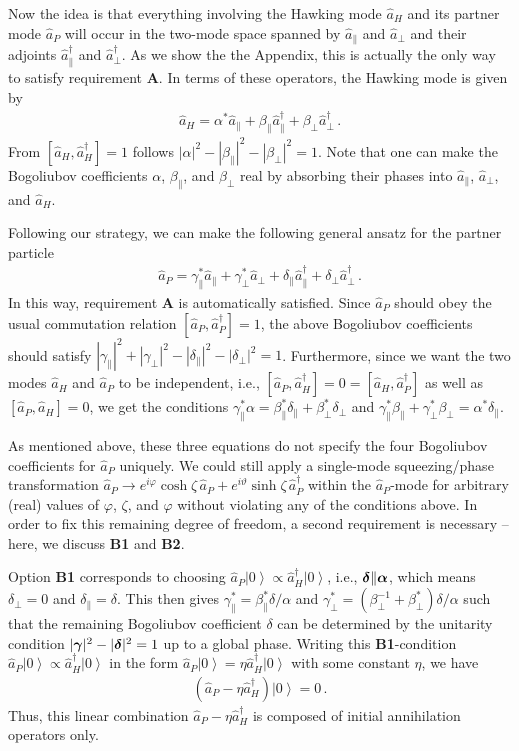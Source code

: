 \documentclass[aps,prd,showpacs,amssymb,nofootinbib,twocolumn]{revtex4}
\newcommand{\ket}[1]{\left|#1\right>}
\newcommand{\f}[1]{\mbox{\boldmath$#1$}}
\newcommand{\bea}{\begin{eqnarray}}
\newcommand{\ea}{\end{eqnarray}}
\begin{document}
%
Now the idea is that everything involving the Hawking mode $\hat a_H$ 
and its partner mode $\hat a_P$ will occur in the two-mode space
spanned by $\hat a_\|$ and $\hat a_\perp$ and their adjoints 
$\hat a_\|^\dagger$ and $\hat a_\perp^\dagger$.
%
As we show the the Appendix, this is actually the only way to 
satisfy requirement {\bf A}. 
%
In terms of these operators, the Hawking mode is given by 
%
\bea
\hat a_H=\alpha^*\hat a_\|
+\beta_\|\hat a_\|^\dagger+\beta_\perp\hat a_\perp^\dagger
\,.
\ea
%
From $[\hat a_H,\hat a_H^\dagger]=1$ follows 
$|\alpha|^2-|\beta_\||^2-|\beta_\perp|^2=1$. 
%
Note that one can make the Bogoliubov coefficients 
$\alpha$, $\beta_\|$, and $\beta_\perp$ real by 
absorbing their phases into  $\hat a_\|$, $\hat a_\perp$, 
and $\hat a_H$. 

Following our strategy, we can make the following general ansatz 
for the partner particle 
%
\bea
\label{partner-ansatz}
\hat a_P
=
\gamma_\|^*\hat a_\|+
\gamma_\perp^*\hat a_\perp+
\delta_\|\hat a_\|^\dagger+
\delta_\perp\hat a_\perp^\dagger
\,.
\ea
%
In this way, requirement {\bf A} is automatically satisfied. 
%
Since $\hat a_P$ should obey the usual commutation relation 
$[\hat a_P,\hat a_P^\dagger]=1$,  the  above Bogoliubov coefficients 
should satisfy $|\gamma_\||^2+|\gamma_\perp|^2-|\delta_\||^2-|\delta_\perp|^2=1$.
%
Furthermore, since we want the two modes $\hat a_H$ and $\hat a_P$
to be independent, i.e., 
$[\hat a_P,\hat a_H^\dagger]=0=[\hat a_H,\hat a_P^\dagger]$ as well as 
$[\hat a_P,\hat a_H]=0$, we get the conditions 
$\gamma_\|^*\alpha=\beta_\|^*\delta_\|+\beta_\perp^*\delta_\perp$ 
and 
$\gamma_\|^*\beta_\|+\gamma_\perp^*\beta_\perp=\alpha^*\delta_\|$. 

As mentioned above, these three equations do not specify the four 
Bogoliubov coefficients for $\hat a_P$ uniquely. 
%
We could still apply a single-mode squeezing/phase transformation 
$\hat a_P\to e^{i\varphi}\cosh\zeta\,\hat a_P+
e^{i\vartheta}\sinh\zeta\,\hat a_P^\dagger$ 
within the $\hat a_P$-mode for arbitrary (real) values of 
$\varphi$, $\zeta$, and $\varphi$ 
without violating any of the conditions above. 
%
In order to fix this remaining degree of freedom, a second requirement  
is necessary -- here, we discuss {\bf B1} and {\bf B2}.  

Option {\bf B1} corresponds to choosing 
$\hat a_P\ket{0}\propto\hat a_H^\dagger\ket{0}$, i.e., 
$\f{\delta}\|\f{\alpha}$, 
which means $\delta_\perp=0$ and $\delta_\|=\delta$. 
%
This then gives $\gamma_\|^*= \beta_\|^*\delta/\alpha$ and 
$\gamma_\perp^*=(\beta_\perp^{-1}+\beta_\perp^*)\delta/\alpha$
such that the remaining Bogoliubov coefficient $\delta$ can be 
determined by the unitarity condition 
$|\f{\gamma}|^2-|\f{\delta}|^2=1$ 
up to a global phase. 
%
Writing this {\bf B1}-condition $\hat a_P\ket{0}\propto\hat a_H^\dagger\ket{0}$
in the form $\hat a_P\ket{0}=\eta\hat a_H^\dagger\ket{0}$ with some constant 
$\eta$, we have 
%
\bea
\left(\hat a_P-\eta\hat a_H^\dagger\right)\ket{0}=0
\,.
\ea
%
Thus, this linear combination $\hat a_P-\eta\hat a_H^\dagger$
is composed of initial annihilation operators only. 
\end{document}
